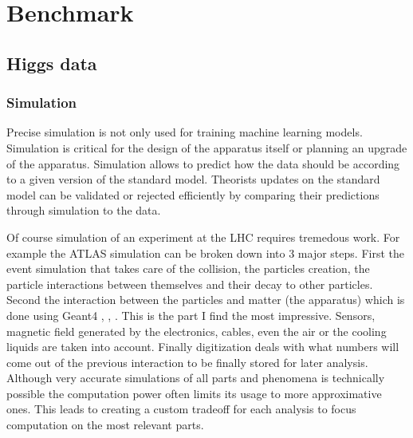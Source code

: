 
\chapter{Benchmark}
\label{chap:benchmark}
\ifpdf
    \graphicspath{{Chapter4/Figs/Raster/}{Chapter4/Figs/PDF/}{Chapter4/Figs/}}
\else
    \graphicspath{{Chapter4/Figs/Vector/}{Chapter4/Figs/}}
\fi





\section{Higgs data} %
\label{sec:higgs_data}






\subsection{Simulation} %
\label{sub:simulation}

Precise simulation is not only used for training machine learning models.
Simulation is critical for the design of the apparatus itself or planning an upgrade of the apparatus.
Simulation allows to predict how the data should be according to a given version of the standard model.
Theorists updates on the standard model can be validated or rejected efficiently by comparing their predictions through simulation to the data.

Of course simulation of an experiment at the LHC requires tremedous work.
For example the ATLAS simulation \cite{Aad_2010} can be broken down into 3 major steps.
First the event simulation that takes care of the collision, the particles creation, the particle interactions between themselves and their decay to other particles.
Second the interaction between the particles and matter (the apparatus) which is done using Geant4 \cite{AGOSTINELLI2003250}, \cite{1610988}, \cite{ALLISON2016186}.
This is the part I find the most impressive.
Sensors, magnetic field generated by the electronics, cables, even the air or the cooling liquids are taken into account.
Finally digitization deals with what numbers will come out of the previous interaction to be finally stored for later analysis.
Although very accurate simulations of all parts and phenomena is technically possible the computation power often limits its usage to more approximative ones. 
This leads to creating a custom tradeoff for each analysis to focus computation on the most relevant parts.

